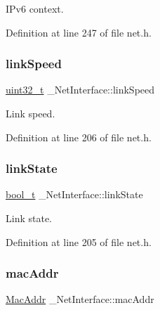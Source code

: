 I\+Pv6 context. 



Definition at line 247 of file net.\+h.

\mbox{\label{struct__NetInterface_a7d7d4032786dfbcf147ea6599ffb146b}} 
\subsubsection{\texorpdfstring{link\+Speed}{linkSpeed}}
{\footnotesize\ttfamily \hyperlink{stdint_8h_a435d1572bf3f880d55459d9805097f62}{uint32\+\_\+t} \+\_\+\+Net\+Interface\+::link\+Speed}



Link speed. 



Definition at line 206 of file net.\+h.

\mbox{\label{struct__NetInterface_a4f48ab9e17cb746f6d9f08e46e112616}} 
\subsubsection{\texorpdfstring{link\+State}{linkState}}
{\footnotesize\ttfamily \hyperlink{compiler__port_8h_a812d16e5494522586b3784e55d479912}{bool\+\_\+t} \+\_\+\+Net\+Interface\+::link\+State}



Link state. 



Definition at line 205 of file net.\+h.

\mbox{\label{struct__NetInterface_a30e2da486befcc6485eb66aa93bc52f5}} 
\subsubsection{\texorpdfstring{mac\+Addr}{macAddr}}
{\footnotesize\ttfamily \hyperlink{ethernet_8h_a1e00ed3977e8a770e8b4ae4cb306d1c0}{Mac\+Addr} \+\_\+\+Net\+Interface\+::mac\+Addr}



